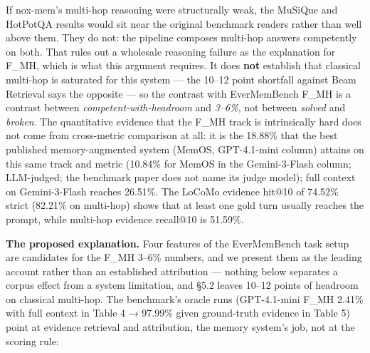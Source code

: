 \documentclass[
]{article}
\begin{document}
If nox-mem's multi-hop reasoning were structurally weak, the MuSiQue and
HotPotQA results would sit near the original benchmark readers rather
than well above them. They do not: the pipeline composes multi-hop
answers competently on both. That rules out a wholesale reasoning
failure as the explanation for F\_MH, which is what this argument
requires. It does \textbf{not} establish that classical multi-hop is
saturated for this system --- the 10--12 point shortfall against Beam
Retrieval says the opposite --- so the contrast with EverMemBench F\_MH
is a contrast between \emph{competent-with-headroom} and \emph{3--6\%},
not between \emph{solved} and \emph{broken}. The quantitative evidence
that the F\_MH track is intrinsically hard does not come from
cross-metric comparison at all: it is the 18.88\% that the best
published memory-augmented system (MemOS, GPT-4.1-mini column) attains
on this same track and metric (10.84\% for MemOS in the Gemini-3-Flash
column; LLM-judged; the benchmark paper does not name its judge model);
full context on Gemini-3-Flash reaches 26.51\%. The LoCoMo evidence
hit@10 of 74.52\% strict (82.21\% on multi-hop) shows that at least one
gold turn usually reaches the prompt, while multi-hop evidence recall@10
is 51.59\%.

\textbf{The proposed explanation.} Four features of the EverMemBench
task setup are candidates for the F\_MH 3--6\% numbers, and we present
them as the leading account rather than an established attribution ---
nothing below separates a corpus effect from a system limitation, and
§5.2 leaves 10--12 points of headroom on classical multi-hop. The
benchmark's oracle runs (GPT-4.1-mini F\_MH 2.41\% with full context in
Table 4 → 97.99\% given ground-truth evidence in Table 5) point at
evidence retrieval and attribution, the memory system's job, not at the
scoring rule:
\end{document}
